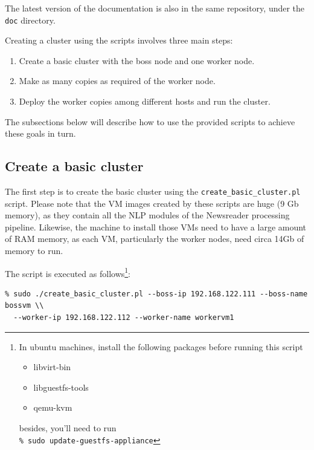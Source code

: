 \documentclass[a4]{article}
\begin{document}
The latest version of the documentation is also in the same repository,
under the \texttt{doc} directory.

Creating a cluster using the scripts involves three main steps:
\begin{enumerate}
\item Create a basic cluster with the boss node and one worker node.
\item Make as many copies as required of the worker node.
\item Deploy the worker copies among different hosts and run the cluster.
\end{enumerate}

The subsections below will describe how to use the provided scripts to
achieve these goals in turn.

\subsection{Create a basic cluster}
\label{sec:create-basic-cluster}

The first step is to create the basic cluster using the
\texttt{create\_basic\_cluster.pl} script. Please note that the VM images
created by these scripts are huge (9 Gb memory), as they contain all the NLP
modules of the Newsreader processing pipeline. Likewise, the machine to
install those VMs need to have a large amount of RAM memory, as each VM,
particularly the worker nodes, need circa 14Gb of memory to run.

The script is executed as follows\footnote{In ubuntu machines, install the
  following packages before running this script
  \begin{itemize}
  \item libvirt-bin
  \item libguestfs-tools
  \item qemu-kvm
  \end{itemize}
\noindent besides, you'll need to run\\
\texttt{\% sudo update-guestfs-appliance}
}:

\begin{verbatim}
% sudo ./create_basic_cluster.pl --boss-ip 192.168.122.111 --boss-name bossvm \\
  --worker-ip 192.168.122.112 --worker-name workervm1
\end{verbatim}
\end{document}
